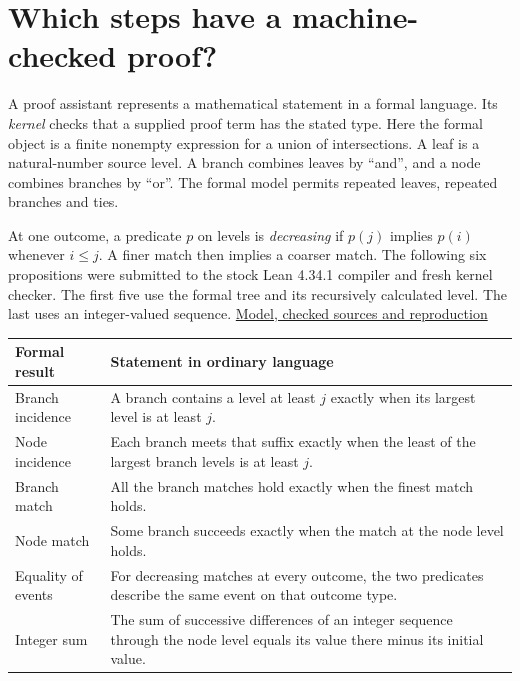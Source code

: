 \clearpage

\section{Which steps have a machine-checked proof?}\label{which-steps-have-a-machine-checked-proof}

A proof assistant represents a mathematical statement in a formal language. Its \emph{kernel} checks that a supplied proof term has the stated type. Here the formal object is a finite nonempty expression for a union of intersections. A leaf is a natural-number source level. A branch combines leaves by ``and'', and a node combines branches by ``or''. The formal model permits repeated leaves, repeated branches and ties.

At one outcome, a predicate \(p\) on levels is \emph{decreasing} if \(p(j)\) implies \(p(i)\) whenever \(i\le j\). A finer match then implies a coarser match. The following six propositions were submitted to the stock Lean 4.34.1 compiler and fresh kernel checker. The first five use the formal tree and its recursively calculated level. The last uses an integer-valued sequence. \href{https://github.com/sepahead/pid-rs/blob/main/audit/research/nested-categorical-sources/stock/README.md}{Model, checked sources and reproduction}

{\def\LTcaptype{none} %
\begin{longtable}[]{@{}
  >{\raggedright\arraybackslash}p{}
  >{\raggedright\arraybackslash}p{}@{}}
\toprule\noalign{}
\begin{minipage}[b]{\linewidth}\raggedright
Formal result
\end{minipage} & \begin{minipage}[b]{\linewidth}\raggedright
Statement in ordinary language
\end{minipage} \\
\midrule\noalign{}
\endhead
\bottomrule\noalign{}
\endlastfoot
Branch incidence & A branch contains a level at least \(j\) exactly when its largest level is at least \(j\). \\
Node incidence & Each branch meets that suffix exactly when the least of the largest branch levels is at least \(j\). \\
Branch match & All the branch matches hold exactly when the finest match holds. \\
Node match & Some branch succeeds exactly when the match at the node level holds. \\
Equality of events & For decreasing matches at every outcome, the two predicates describe the same event on that outcome type. \\
Integer sum & The sum of successive differences of an integer sequence through the node level equals its value there minus its initial value. \\
\end{longtable}
}

